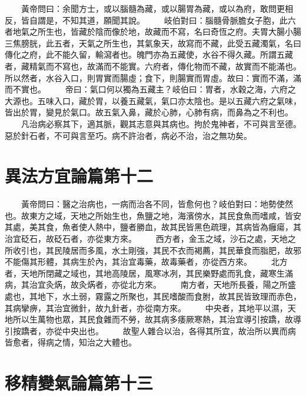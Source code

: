 　　黃帝問曰：余聞方士，或以腦髓為藏，或以腸胃為藏，或以為府，敢問更相反，皆自謂是，不知其道，願聞其說。
　　岐伯對曰：腦髓骨脈膽女子胞，此六者地氣之所生也，皆藏於陰而像於地，故藏而不寫，名曰奇恆之府。夫胃大腸小腸三焦膀胱，此五者，天氣之所生也，其氣象天，故寫而不藏，此受五藏濁氣，名曰傳化之府，此不能久留，輸瀉者也。魄門亦為五藏使，水谷不得久藏。所謂五藏者，藏精氣而不寫也，故滿而不能實。六府者，傳化物而不藏，故實而不能滿也。所以然者，水谷入口，則胃實而腸虛；食下，則腸實而胃虛。故曰：實而不滿，滿而不實也。
　　帝曰：氣口何以獨為五藏主？岐伯曰：胃者，水穀之海，六府之大源也。五味入口，藏於胃，以養五藏氣，氣口亦太陰也。是以五藏六府之氣味，皆出於胃，變見於氣口。故五氣入鼻，藏於心肺，心肺有病，而鼻為之不利也。
　　凡治病必察其下，適其脈，觀其志意與其病也。拘於鬼神者，不可與言至德。惡於針石者，不可與言至巧。病不許治者，病必不治，治之無功矣。


\section{異法方宜論篇第十二}

　　黃帝問曰：醫之治病也，一病而治各不同，皆愈何也？岐伯對曰：地勢使然也。故東方之域，天地之所始生也，魚鹽之地，海濱傍水，其民食魚而嗜咸，皆安其處，美其食，魚者使人熱中，鹽者勝血，故其民皆黑色疏理，其病皆為癰瘍，其治宜砭石，故砭石者，亦從東方來。
　　西方者，金玉之域，沙石之處，天地之所收引也，其民陵居而多風，水土剛強，其民不衣而褐薦，其民華食而脂肥，故邪不能傷其形體，其病生於內，其治宜毒藥，故毒藥者，亦從西方來。
　　北方者，天地所閉藏之域也，其地高陵居，風寒冰冽，其民樂野處而乳食，藏寒生滿病，其治宜灸焫，故灸焫者，亦從北方來。
　　南方者，天地所長養，陽之所盛處也，其地下，水土弱，霧露之所聚也，其民嗜酸而食胕，故其民皆致理而赤色，其病攣痹，其治宜微針，故九針者，亦從南方來。
　　中央者，其地平以濕，天地所以生萬物也眾，其民食雜而不勞，故其病多痿厥寒熱，其治宜導引按蹻，故導引按蹻者，亦從中央出也。
　　故聖人雜合以治，各得其所宜，故治所以異而病皆愈者，得病之情，知治之大體也。
\section{移精變氣論篇第十三}

